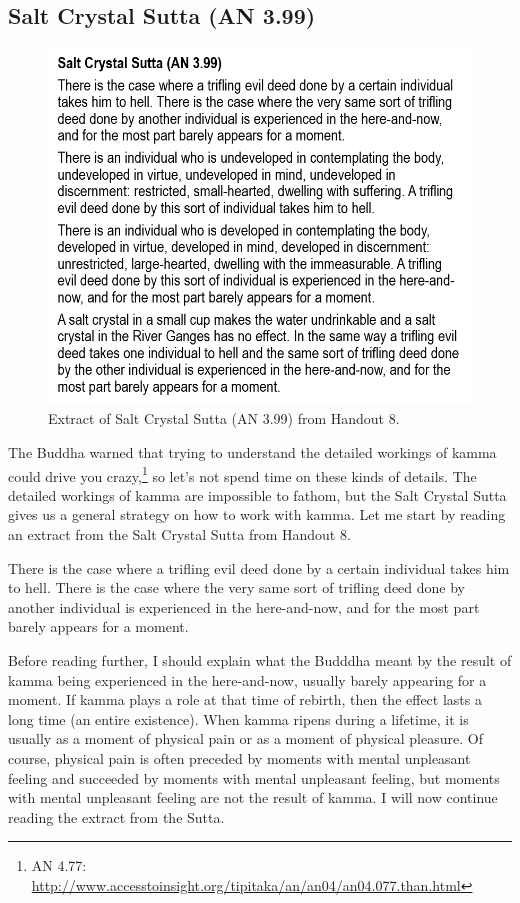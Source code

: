 \subsection*{Salt Crystal Sutta (AN 3.99)}

\begin{figure}[h]
\centering
\includegraphics[width=0.7\linewidth]{./Diagrams/AN3}
\caption{Extract of Salt Crystal Sutta (AN 3.99) from Handout 8.}
\label{fig:AN3}
\end{figure}

The Buddha warned that trying to understand the detailed workings of kamma could drive you crazy,\footnote{AN 4.77: \url{http://www.accesstoinsight.org/tipitaka/an/an04/an04.077.than.html}} so let’s not spend time on these kinds of details. The detailed workings of kamma are impossible to fathom, but the Salt Crystal Sutta gives us a general strategy on how to work with kamma. Let me start by reading an extract from the Salt Crystal Sutta from Handout 8.

There is the case where a trifling evil deed done by a certain individual takes him to hell. There is the case where the very same sort of trifling deed done by another individual is experienced in the here-and-now, and for the most part barely appears for a moment.

\color{red}

Before reading further, I should explain what the Budddha meant by the result of kamma being experienced in the here-and-now, usually barely appearing for a moment. If kamma plays a role at that time of rebirth, then the effect lasts a long time (an entire existence). When kamma ripens during a lifetime, it is usually as a moment of physical pain or as a moment of physical pleasure. Of course, physical pain is often preceded by moments with mental unpleasant feeling and succeeded by moments with mental unpleasant feeling, but moments with mental unpleasant feeling are not the result of kamma. I will now continue reading the extract from the Sutta.

